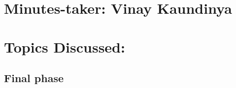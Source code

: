 \documentclass[11pt]{meetingmins} %
\begin{document}
\maketitle

\section{Minutes-taker: Vinay Kaundinya}

\section{Topics Discussed:}

\subsection{Final phase}
\end{document}
